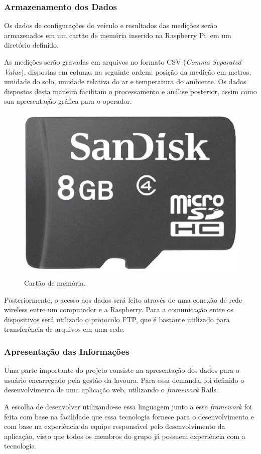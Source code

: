   \subsubsection{Armazenamento dos Dados}
  Os dados de configurações do veículo e resultados das medições serão armazenados
  em um cartão de memória inserido na Raspberry Pi, em um diretório definido.

  As medições serão gravadas em arquivos no formato CSV (\textit{Comma Separated Value}),
  dispostas em colunas na seguinte ordem: posição da medição
  em metros, umidade do solo, umidade relativa do ar e temperatura do
  ambiente.
  Os dados dispostos desta maneira facilitam o processamento e
  análise posterior, assim como sua apresentação gráfica para
  o operador.

  \begin{figure}[!htbp]
  \begin{center}
  \includegraphics[width=.3\textwidth]{figuras/sdcard.eps}
  \caption{\label{fig:sdcard}Cartão de memória.}
  \end{center}
  \end{figure}

  Posteriormente, o acesso aos dados será feito através de uma conexão de  rede
  wireless entre um computador e a Raspberry. Para a comunicação  entre os
  dispositivos será utilizado o protocolo FTP, que é bastante utilizado para
  transferência de arquivos em uma rede.

  \subsubsection{Apresentação das Informações}

  Uma parte importante do projeto consiste na apresentação dos
  dados para o usuário encarregado pela gestão da lavoura. Para essa demanda,
  foi definido o desenvolvimento de uma aplicação web, utilizando
  o \textit{framework} Rails.

  A escolha de desenvolver utilizando-se essa linguagem junto a
  esse \textit{framework} foi feita com base na facilidade que essa
  tecnologia fornece para o desenvolvimento e com base na experiência
  da equipe responsável pelo desenvolvimento da aplicação, visto que
  todos os membros do grupo já possuem experiência com a tecnologia.

